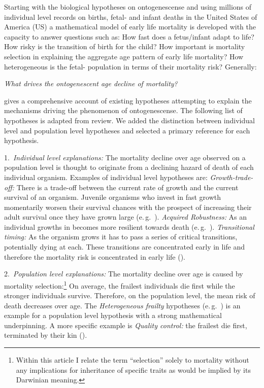 \documentclass[12pt, parskip=half]{scrartcl}
\begin{document}
Starting with the biological hypotheses on ontogenescense and using millions of individual level records on births, fetal- and infant deaths in the United States of America (US) a mathematical model of early life mortality is developed with the capacity to answer questions such as: How fast does a fetus/infant adapt to life? How risky is the transition of birth for the child? How important is mortality selection in explaining the aggregate age pattern of early life mortality? How heterogeneous is the fetal- population in terms of their mortality risk? Generally:

\begin{center}
  \emph{What drives the ontogenescent age decline of mortality?}
\end{center}

\cite{Levitis2011} gives a comprehensive account of existing hypotheses attempting to explain the mechanisms driving the phenomenon of ontogenescense. The following list of hypotheses is adapted from \citeauthor{Levitis2011} review. We added the distinction between individual level and population level hypotheses and selected a primary reference for each hypothesis.

1.~\emph{Individual level explanations:} The mortality decline over age observed on a population level is thought to originate from a declining hazard of death of each individual organism. Examples of individual level hypotheses are:
  \emph{Growth-trade-off:} There is a trade-off between the current rate of growth and the current survival of an organism. Juvenile organisms who invest in fast growth momentarily worsen their survival chances with the prospect of increasing their adult survival once they have grown large (e.\,g.~\cite{Chu2008}).
  \emph{Acquired Robustness:} As an individual growths in becomes more resilient towards death (e.\,g.~\cite{Munch2006}).
  \emph{Transitional timing:} As the organism grows it has to pass a series of critical transitions, potentially dying at each. These transitions are concentrated early in life and therefore the mortality risk is concentrated in early life (\cite{Levitis2011}).

2.~\emph{Population level explanations:} The mortality decline over age is caused by mortality selection:\footnote{Within this article I relate the term \enquote{selection} solely to mortality without any implications for inheritance of specific traits as would be implied by its Darwinian meaning.} On average, the frailest individuals die first while the stronger individuals survive. Therefore, on the population level, the mean risk of death decreases over age. The \emph{Heterogeneous frailty} hypotheses (e.\,g.~\cite{Vaupel1985}) is an example for a population level hypothesis with a strong mathematical underpinning. A more specific example is \emph{Quality control:} the frailest die first, terminated by their kin (\cite{Hamilton1966}).
\end{document}
